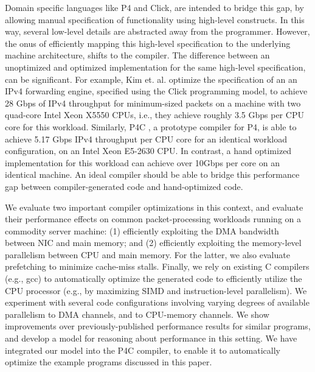 Domain specific languages like P4\cite{Bosshart:2014:PPP:2656877.2656890} and Click\cite{kohler2000click}, are intended
to bridge this gap, by allowing manual specification of functionality using high-level constructs. In this way, several
low-level details are abstracted away from the programmer. However, the onus of efficiently mapping this high-level
specification to the underlying machine architecture, shifts to the compiler. The difference between an unoptimized
and optimized implementation for the same high-level specification, can be significant.
For example, Kim et. al. \cite{Kim:2012:PBC:2349896.2349910} optimize the specification of an
an IPv4 forwarding engine, specified using the Click programming model, to achieve 28 Gbps of IPv4 throughput for minimum-sized
packets
on a machine with two quad-core Intel Xeon X5550 CPUs, i.e., they achieve roughly 3.5 Gbps per CPU core for this workload.
Similarly, P4C \cite{p4c}, a prototype compiler for P4,
is able to achieve 5.17 Gbps IPv4 throughput per CPU core for an identical workload configuration, on an Intel Xeon E5-2630
CPU. In contrast, a hand optimized implementation for this workload can achieve over 10Gbps per core on an
identical machine. An ideal compiler should be able to
bridge this performance gap between compiler-generated code and hand-optimized code.

We evaluate two important compiler optimizations in this context, and evaluate their performance
effects on common packet-processing workloads running on a commodity server machine: (1) efficiently exploiting
the DMA bandwidth between NIC and main memory; and (2) efficiently exploiting the memory-level
parallelism between CPU and main memory. For the latter, we also evaluate prefetching to minimize
cache-miss stalls. Finally, we rely on existing C compilers (e.g., gcc) to automatically optimize
the generated code to efficiently utilize the CPU processor (e.g., by maximizing SIMD
and instruction-level parallelism). We experiment with several code configurations involving varying
degrees of available parallelism to DMA channels, and to CPU-memory channels. We show
improvements over previously-published performance results for similar programs, and develop a model
for reasoning about performance in this setting. We have integrated our model into the
P4C compiler, to enable it to
automatically optimize the example programs discussed in this paper.


